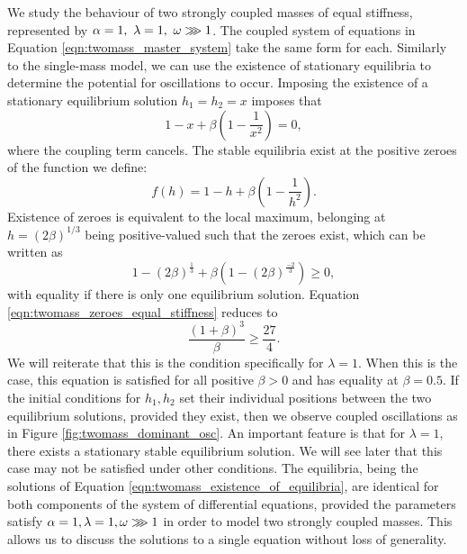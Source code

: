 We study the behaviour of two strongly coupled masses of equal stiffness, represented by \( \alpha = 1,~\lambda = 1,~\omega \gggtr 1\).
The coupled system of equations in Equation \ref{eqn:twomass_master_system} take the same form for each.
Similarly to the single-mass model, we can use the existence of stationary equilibria to determine the potential for oscillations to occur.
Imposing the existence of a stationary equilibrium solution \(h_1 = h_2 = x\) imposes that
\begin{equation}
    1 - x + \beta\left(
        1 - \frac{1}{x^2}
    \right) = 0,
\end{equation}
where the coupling term cancels.
The stable equilibria exist at the positive zeroes of the function we define:
\begin{equation}
    f(h) = 1 - h + \beta \left( 1 - \frac{1}{h^2} \right).
    \label{eqn:twomass_existence_of_equilibria}
\end{equation}
Existence of zeroes is equivalent to the local maximum, belonging at \(h = \left( 2\beta \right)^{1/3}\) being positive-valued such that the zeroes exist,
which can be written as
\begin{equation}
    1 - \left(2\beta\right)^\frac{1}{3} + \beta\left( 1 - (2\beta)^\frac{-2}{3} \right) \ge 0,
    \label{eqn:twomass_zeroes_equal_stiffness}
\end{equation}
with equality if there is only one equilibrium solution.
Equation \ref{eqn:twomass_zeroes_equal_stiffness} reduces to
\begin{equation}
    \frac{(1+\beta)^3}{\beta} \ge \frac{27}{4}.
\end{equation}
We will reiterate that this is the condition specifically for $\lambda=1$.
When this is the case, this equation is satisfied for all positive $\beta>0$ and has equality at $\beta = 0.5$.
If the initial conditions for \(h_1, h_2\) set their individual positions between the two equilibrium solutions,
provided they exist,
then we observe coupled oscillations as in Figure \ref{fig:twomass_dominant_osc}.
An important feature is that for \(\lambda = 1\), there exists a stationary stable equilibrium solution.
We will see later that this case may not be satisfied under other conditions. %
The equilibria, being the solutions of Equation \ref{eqn:twomass_existence_of_equilibria}, are identical for both components of the system of differential equations,
provided the parameters satisfy \(\alpha = 1, \lambda = 1, \omega \gggtr 1\) in order to model two strongly coupled masses.
This allows us to discuss the solutions to a single equation without loss of generality.
